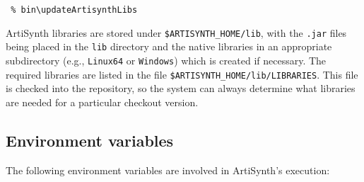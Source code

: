 \documentclass{article}
\begin{document}
\begin{verbatim}
 % bin\updateArtisynthLibs
\end{verbatim}

ArtiSynth libraries are stored under {\tt \$ARTISYNTH\_HOME/lib}, with
the {\tt .jar} files being placed in the {\tt lib} directory and the
native libraries in an appropriate subdirectory (e.g., {\tt Linux64} or
{\tt Windows}) which is created if necessary. The required libraries
are listed in the file {\tt \$ARTISYNTH\_HOME/lib/LIBRARIES}. This
file is checked into the repository, so the system can always
determine what libraries are needed for a particular checkout version.

\subsection{Environment variables}
\label{environmentVariablesSec}

The following environment variables are involved in ArtiSynth's execution:
\end{document}
